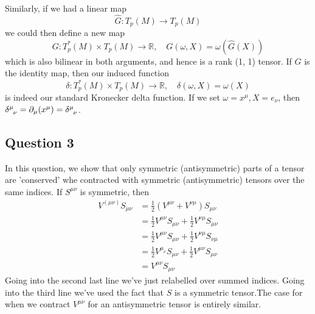 \documentclass[11pt, a4paper]{article}   	%
\theoremstyle{slplain}
\begin{document}
Similarly, if we had a linear map 
\[ 
\hat{G} : T_p( M ) \rightarrow T_p( M) 
\]
we could then define a new map 
\[ 
G : T_p^* ( M) \times T_p(M) \rightarrow \mathbb{ R}, \quad G( \omega, X)  = \omega ( \hat{G} ( X)) \] 
which is also bilinear in both arguments, and hence is a rank (1, 1) tensor. If $G$ is the identity map, then our induced function 
\[ 
\delta : T_p^* ( M) \times T_p( M ) \rightarrow \mathbb{R}, \quad \delta ( \omega, X ) = \omega (X) 
\] is indeed our standard Kronecker delta function. If we set $\omega = x^\mu, X = e_\nu$, then $\delta\indices{^\mu_\nu} = \partial_\mu(x^\mu) = \delta\indices{^\mu_\nu}$. 

\pagebreak 
\subsection{Question 3} 
In this question, we show that only symmetric (antisymmetric) parts of a tensor are 'conserved' whe contracted with symmetric (antisymmetric) tensors over the same indices. If $S^{ \mu \nu} $ is symmetric, then 
\begin{align*} 
V^{ ( \mu \nu) } S_{\mu \nu}  & = \frac{1}{2} \left( V^{ \mu \nu} + V^{ \nu \mu} \right)S_{ \mu \nu} \\
&= \frac{1}{2} V^{\mu \nu}S_{ \mu \nu} + \frac{1}{2} V^{ \nu \mu} S_{\mu \nu} \\
&= \frac{1}{2} V^{\mu \nu}S_{ \mu \nu} + \frac{1}{2} V^{\nu \mu}S_{ \nu \mu } \\
&= \frac{1}{ 2} V^{\mu_\nu} S_{ \mu \nu} + \frac{1}{2} V^{\mu \nu}S_{ \mu \nu} \\
&= V^{ \mu \nu} S_{ \mu \nu} 
\end{align*} 
Going into the second last line we've just relabelled over summed indices. Going into the third line we've used the fact that $S$ is a symmetric tensor.The case for when we contract $V^{\mu \nu}$ for an antisymmetric tensor is entirely similar. 



\pagebreak 
\end{document}
